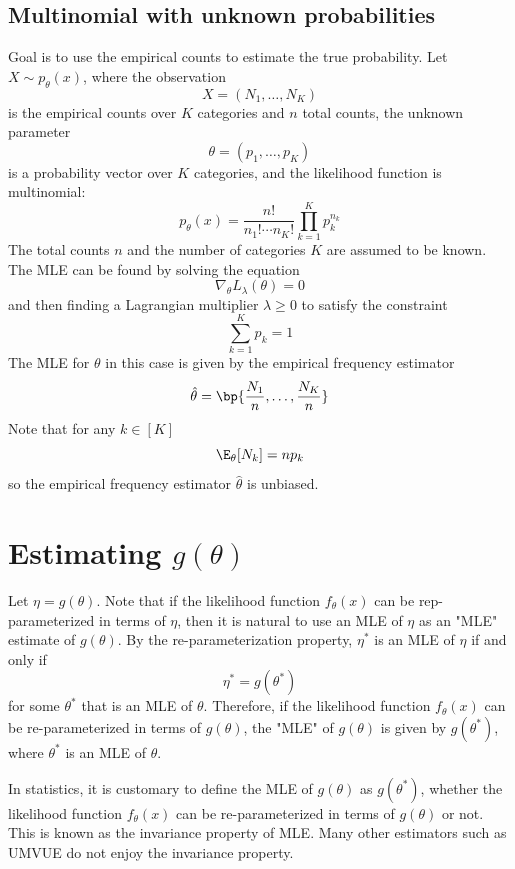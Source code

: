 \subsection{Multinomial with unknown probabilities}
Goal is to use the empirical counts to estimate the true probability.
Let $X\sim p_\theta(x)$, where the observation
\[
    X = (N_1, \dots, N_K)
\]
is the empirical counts over $K$ categories and $n$ total counts, the unknown parameter
\[
    \theta = (p_1, \dots, p_K)
\]
is a probability vector over $K$ categories, and the likelihood function is multinomial:
\[
    p_\theta(x) = \frac{n!}{n_1!\cdots n_K!} \prod_{k=1}^K{p_k^{n_k}}
\]
The total counts $n$ and the number of categories $K$ are assumed to be known. The MLE can be found by
solving the equation
\[
    \nabla_\theta L_\lambda (\theta) = 0
\]
and then finding a Lagrangian multiplier $\lambda \geq 0$ to satisfy the constraint
\[
    \sum_{k=1}^K p_k = 1
\]
The MLE for $\theta$ in this case is given by the empirical frequency estimator
\[
    \hat{\theta} = \bp{\frac{N_1}{n}, \dots, \frac{N_K}{n}}
\]
Note that for any $k \in [K]$
\[
    \E_\theta[N_k] = np_k
\]
so the empirical frequency estimator $\hat{\theta}$ is unbiased.
\section{Estimating $g(\theta)$}
Let $\eta = g(\theta)$. Note that if the likelihood function $f_\theta(x)$ can be rep-parameterized in terms of
$\eta$, then it is natural to use an MLE of $\eta$ as an "MLE" estimate of $g(\theta)$. By the re-parameterization
property, $\eta^*$ is an MLE of $\eta$ if and only if
\[
    \eta^* = g(\theta^*)
\]
for some $\theta^*$ that is an MLE of $\theta$. Therefore, if the likelihood function $f_\theta(x)$ can be re-parameterized
in terms of $g(\theta)$, the "MLE" of $g(\theta)$ is given by $g(\theta^*)$, where $\theta^*$ is an MLE of $\theta$.

In statistics, it is customary to define the MLE of $g(\theta)$ as $g(\theta^*)$, whether the likelihood function $f_\theta(x)$ can be re-parameterized
in terms of $g(\theta)$ or not. This is known as the invariance property of MLE. Many other estimators
such as UMVUE do not enjoy the invariance property.